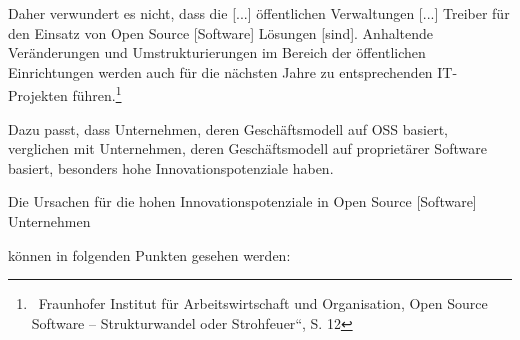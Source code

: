 \documentclass[a4paper]{article}
\begin{document}
{
Daher verwundert es nicht, dass die {\guillemotright} [...]
\"offentlichen Verwaltungen [...] Treiber f\"ur den Einsatz von Open
Source [Software] L\"osungen [sind]. Anhaltende Ver\"anderungen und
Umstrukturierungen im Bereich der \"offentlichen Einrichtungen werden
auch f\"ur die n\"achsten Jahre zu entsprechenden IT-Projekten
f\"uhren.{\guillemotleft}\footnote{\ Fraunhofer Institut f\"ur
Arbeitswirtschaft und Organisation, {\quotedblbase}Open Source Software
-- Strukturwandel oder Strohfeuer{\textquotedblleft}, S. 12}}


\bigskip

{
Dazu passt, dass Unternehmen, deren Gesch\"aftsmodell auf OSS basiert,
verglichen mit Unternehmen, deren Gesch\"aftsmodell auf propriet\"arer
Software basiert, besonders hohe Innovationspotenziale haben.}

{
{\guillemotright}Die Ursachen f\"ur die hohen Innovationspotenziale in
Open Source [Software] Unternehmen}

{
k\"onnen in folgenden Punkten gesehen werden:}
\end{document}
